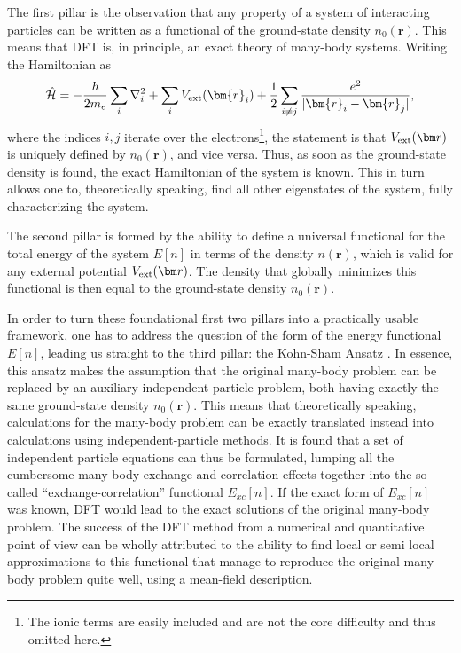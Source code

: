 The first pillar is the observation that any property of a system of interacting particles can be written as a functional of the ground-state density $n_0(\bm{r})$.
This means that \gls{DFT} is, in principle, an exact theory of many-body systems.
Writing the Hamiltonian as
\begin{equation}
	\hat{\mathcal{H}} = -\frac{\hbar}{2m_e} \sum_i \nabla_i^2 + \sum_i V_{\rm ext}(\bm{r}_i) + \frac{1}{2}\sum_{i\neq j} \frac{e^2}{|\bm{r}_i - \bm{r}_j|},
\end{equation}
where the indices $i,j$ iterate over the electrons\footnote{The ionic terms are easily included and are not the core difficulty and thus omitted here.}, the statement is that $V_{\rm ext}(\bm r)$ is uniquely defined by $n_0(\bm{r})$, and vice versa.
Thus, as soon as the ground-state density is found, the exact Hamiltonian of the system is known.
This in turn allows one to, theoretically speaking, find all other eigenstates of the system, fully characterizing the system.

The second pillar is formed by the ability to define a universal functional for the total energy of the system $E[n]$ in terms of the density $n(\bm{r})$, which is valid for any external potential $V_{\rm ext}(\bm r)$.
The density that globally minimizes this functional is then equal to the ground-state density $n_0(\bm{r})$.

In order to turn these foundational first two pillars into a practically usable framework, one has to address the question of the form of the energy functional $E[n]$, leading us straight to the third pillar: the Kohn-Sham Ansatz \cite{Kohn1965}.
In essence, this ansatz makes the assumption that the original many-body problem can be replaced by an auxiliary independent-particle problem, both having exactly the same ground-state density $n_0(\bm{r})$.
This means that theoretically speaking, calculations for the many-body problem can be exactly translated instead into calculations using independent-particle methods.
It is found that a set of independent particle equations can thus be formulated, lumping all the cumbersome many-body exchange and correlation effects together into the so-called ``exchange-correlation'' functional $E_{xc}[n]$.
If the exact form of $E_{xc}[n]$ was known, \gls{DFT} would lead to the exact solutions of the original many-body problem.
The success of the \gls{DFT} method from a numerical and quantitative point of view can be wholly attributed to the ability to find local or semi local approximations to this functional that manage to reproduce the original many-body problem quite well, using a mean-field description.

